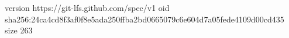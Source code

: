 version https://git-lfs.github.com/spec/v1
oid sha256:24ca4cd8f3af0f8e5ada250ffba2bd0665079c6e604d7a05fede4109d00cd435
size 263
